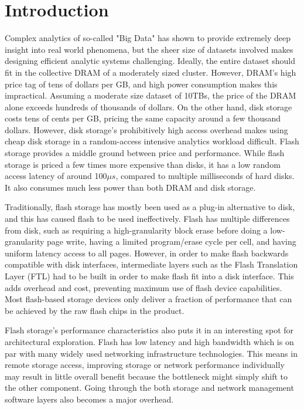 \section{Introduction}

Complex analytics of so-called "Big Data" has shown to provide extremely deep
insight into real world phenomena, but the sheer size of datasets involved makes
designing efficient analytic systems challenging. Ideally, the entire dataset
should fit in the collective DRAM of a moderately sized cluster. However, DRAM's
high price tag of tens of dollars per GB, and high power consumption makes this
impractical. Assuming a moderate size dataset of 10TBs, the price of the DRAM
alone exceeds hundreds of thousands of dollars. On the other hand, disk storage
costs tens of cents per GB, pricing the same capacity around a few thousand
dollars. However, disk storage's prohibitively high access overhead makes
using cheap disk storage in a random-access intensive analytics workload
difficult. Flash storage provides a middle ground between price and performance. While
flash storage is priced a few times more expensive than disks, it has a low
random access latency of around 100$\mu s$, compared to multiple milliseconds of
hard disks. It also consumes much less power than both DRAM and disk storage.


Traditionally, flash storage has mostly been used as a plug-in alternative to
disk, and this has caused flash to be used ineffectively. Flash has multiple
differences from disk, such as requiring a high-granularity block erase
before doing a low-granularity page write, having a limited program/erase
cycle per cell, and having uniform latency access to all pages.
However, in order to make flash backwards compatible with disk interfaces,
intermediate layers such as the Flash Translation Layer (FTL) had to be built in
order to make flash fit into a disk interface. This adds overhead and
cost, preventing maximum use of flash device capabilities. Most flash-based
storage devices only deliver a fraction of performance that can be achieved by
the raw flash chips in the product.


Flash storage's performance characteristics also puts it in an interesting spot
for architectural exploration. Flash has low latency and high bandwidth which is
on par with many widely used networking infrastructure technologies. This means
in remote storage access, improving storage or network performance individually
may result in little overall benefit because the bottleneck might simply shift
to the other component. Going through the both storage and network management
software layers also becomes a major overhead.

